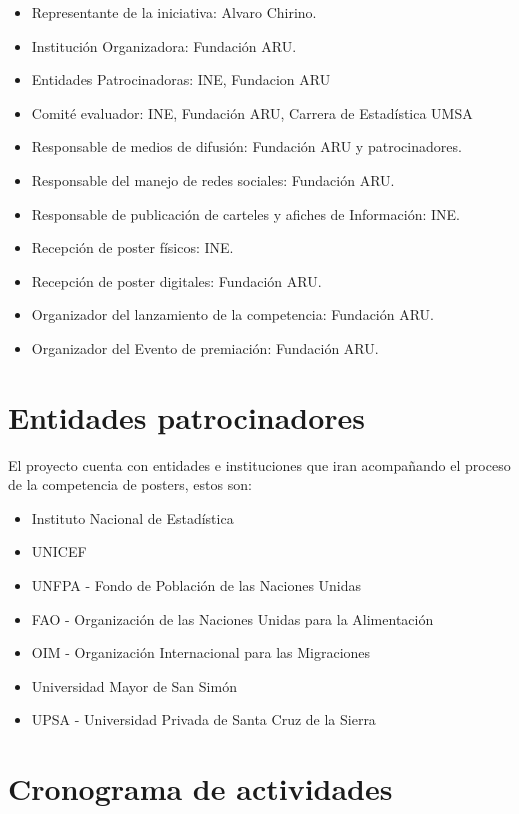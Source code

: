 \documentclass{article}
\begin{document}
\begin{itemize}
\item Representante de la iniciativa: Alvaro Chirino.  
\item Institución Organizadora: Fundación ARU.
\item Entidades Patrocinadoras: INE, Fundacion ARU
\item Comité evaluador: INE, Fundación ARU, Carrera de Estadística UMSA
\item Responsable de medios de difusión:  Fundación ARU y patrocinadores. 
\item Responsable del manejo de redes sociales: Fundación ARU.
\item Responsable de publicación de carteles y afiches de Información: INE.
\item Recepción de poster físicos: INE.
\item Recepción de poster digitales: Fundación ARU.
\item Organizador del lanzamiento de la competencia: Fundación ARU.
\item Organizador del Evento de premiación: Fundación ARU.
\end{itemize}

\section{Entidades patrocinadores}

El proyecto cuenta con entidades e instituciones que iran acompañando el proceso de la competencia de posters, estos son:

\begin{itemize}
\item Instituto Nacional de Estadística 
\item UNICEF
\item UNFPA - Fondo de Población de las Naciones Unidas
\item FAO - Organización de las Naciones Unidas para la Alimentación
\item OIM - Organización Internacional para las Migraciones 
\item Universidad Mayor de San Simón
\item UPSA - Universidad Privada de Santa Cruz de la Sierra
\end{itemize}

\section{Cronograma de actividades}
\end{document}
